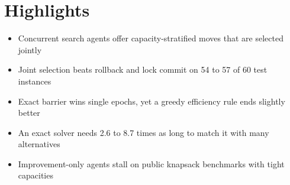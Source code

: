 \documentclass[11pt]{article}
\begin{document}
\section*{Highlights}

\begin{itemize}
    \item Concurrent search agents offer capacity-stratified moves that are selected jointly
    \item Joint selection beats rollback and lock commit on 54 to 57 of 60 test instances
    \item Exact barrier wins single epochs, yet a greedy efficiency rule ends slightly better
    \item An exact solver needs 2.6 to 8.7 times as long to match it with many alternatives
    \item Improvement-only agents stall on public knapsack benchmarks with tight capacities
\end{itemize}
\end{document}
